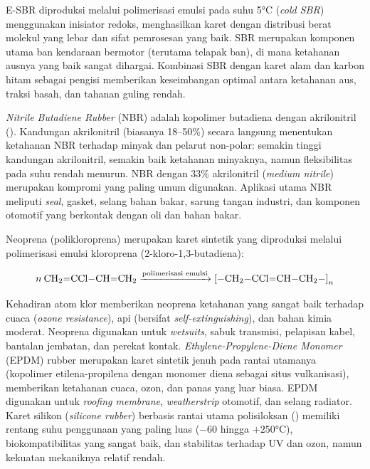 \documentclass[12pt,a4paper,openany]{book}
\begin{document}
E-SBR diproduksi melalui polimerisasi emulsi pada suhu 5°C (\textit{cold SBR}) menggunakan inisiator redoks, menghasilkan karet dengan distribusi berat molekul yang lebar dan sifat pemrosesan yang baik. SBR merupakan komponen utama ban kendaraan bermotor (terutama telapak ban), di mana ketahanan ausnya yang baik sangat dihargai. Kombinasi SBR dengan karet alam dan karbon hitam sebagai pengisi memberikan keseimbangan optimal antara ketahanan aus, traksi basah, dan tahanan guling rendah.

\textit{Nitrile Butadiene Rubber} (NBR) adalah kopolimer butadiena dengan akrilonitril (). Kandungan akrilonitril (biasanya 18--50\%) secara langsung menentukan ketahanan NBR terhadap minyak dan pelarut non-polar: semakin tinggi kandungan akrilonitril, semakin baik ketahanan minyaknya, namun fleksibilitas pada suhu rendah menurun. NBR dengan 33\% akrilonitril (\textit{medium nitrile}) merupakan kompromi yang paling umum digunakan. Aplikasi utama NBR meliputi \textit{seal}, gasket, selang bahan bakar, sarung tangan industri, dan komponen otomotif yang berkontak dengan oli dan bahan bakar.

Neoprena (polikloroprena) merupakan karet sintetik yang diproduksi melalui polimerisasi emulsi kloroprena (2-kloro-1,3-butadiena):

\begin{equation}
n\:\ce{CH2=CCl-CH=CH2} \xrightarrow{\text{polimerisasi emulsi}} \ce{[-CH2-CCl=CH-CH2-]}_n
\end{equation}

Kehadiran atom klor memberikan neoprena ketahanan yang sangat baik terhadap cuaca (\textit{ozone resistance}), api (bersifat \textit{self-extinguishing}), dan bahan kimia moderat. Neoprena digunakan untuk \textit{wetsuits}, sabuk transmisi, pelapisan kabel, bantalan jembatan, dan perekat kontak. \textit{Ethylene-Propylene-Diene Monomer} (EPDM) rubber merupakan karet sintetik jenuh pada rantai utamanya (kopolimer etilena-propilena dengan monomer diena sebagai situs vulkanisasi), memberikan ketahanan cuaca, ozon, dan panas yang luar biasa. EPDM digunakan untuk \textit{roofing membrane}, \textit{weatherstrip} otomotif, dan selang radiator. Karet silikon (\textit{silicone rubber}) berbasis rantai utama polisiloksan () memiliki rentang suhu penggunaan yang paling luas ($-60$ hingga $+250$°C), biokompatibilitas yang sangat baik, dan stabilitas terhadap UV dan ozon, namun kekuatan mekaniknya relatif rendah.
\end{document}
